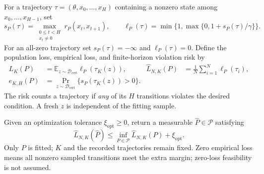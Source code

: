 \begin{definition}
\label{def:foundation_risk}
For a trajectory $\tau=(\theta,x_0,\ldots,x_H)$ containing a nonzero state
among $x_0,\ldots,x_{H-1}$, set
\begin{equation}
\label{eq:foundation_trajectory_loss}
 s_P(\tau)=\max_{\substack{0\le t<H\\x_t\ne0}}r_P(x_t,x_{t+1}),
 \qquad
 \ell_P(\tau)=\min\{1,\max\{0,1+s_P(\tau)/\gamma\}\}.
\end{equation}
For an all-zero trajectory set $s_P(\tau)=-\infty$ and $\ell_P(\tau)=0$.
Define the population loss, empirical loss, and finite-horizon violation risk
by
\begin{align}
\label{eq:foundation_population_empirical}
 L_K(P)&=\mathbb E_{z\sim\mathcal D_{\mathrm{cert}}}
                  \ell_P(\tau_K(z)),
 &\widehat L_{N,K}(P)&=\frac1N\sum_{i=1}^N\ell_P(\tau_i),\\
\label{eq:foundation_violation_risk}
 e_{K,H}(P)&=\Pr_{z\sim\mathcal D_{\mathrm{cert}}}
                   \{s_P(\tau_K(z))>0\}.
\end{align}
The risk counts a trajectory if \emph{any} of its $H$ transitions violates
the desired condition. A fresh $z$ is independent of the fitting sample.
\end{definition}

\begin{definition}
\label{def:foundation_fitting}
Given an optimization tolerance $\xi_{\mathrm{opt}}\ge0$, return a measurable
$\widehat P\in\mathcal P$ satisfying
\begin{equation}
\label{eq:foundation_erm}
 \widehat L_{N,K}(\widehat P)
 \le\inf_{P\in\mathcal P}\widehat L_{N,K}(P)+\xi_{\mathrm{opt}}.
\end{equation}
Only $P$ is fitted; $K$ and the recorded trajectories remain fixed.
Zero empirical loss means all nonzero sampled transitions meet the extra
margin; zero-loss feasibility is not assumed.
\end{definition}

